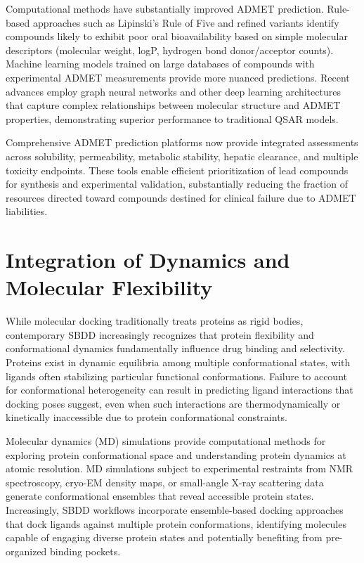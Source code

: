 \documentclass[12pt,a4paper]{article}
\begin{document}
Computational methods have substantially improved ADMET prediction. Rule-based approaches such as Lipinski's Rule of Five and refined variants identify compounds likely to exhibit poor oral bioavailability based on simple molecular descriptors (molecular weight, logP, hydrogen bond donor/acceptor counts). Machine learning models trained on large databases of compounds with experimental ADMET measurements provide more nuanced predictions. Recent advances employ graph neural networks and other deep learning architectures that capture complex relationships between molecular structure and ADMET properties, demonstrating superior performance to traditional QSAR models.

Comprehensive ADMET prediction platforms now provide integrated assessments across solubility, permeability, metabolic stability, hepatic clearance, and multiple toxicity endpoints. These tools enable efficient prioritization of lead compounds for synthesis and experimental validation, substantially reducing the fraction of resources directed toward compounds destined for clinical failure due to ADMET liabilities.

\section*{Integration of Dynamics and Molecular Flexibility}

While molecular docking traditionally treats proteins as rigid bodies, contemporary SBDD increasingly recognizes that protein flexibility and conformational dynamics fundamentally influence drug binding and selectivity. Proteins exist in dynamic equilibria among multiple conformational states, with ligands often stabilizing particular functional conformations. Failure to account for conformational heterogeneity can result in predicting ligand interactions that docking poses suggest, even when such interactions are thermodynamically or kinetically inaccessible due to protein conformational constraints.

Molecular dynamics (MD) simulations provide computational methods for exploring protein conformational space and understanding protein dynamics at atomic resolution. MD simulations subject to experimental restraints from NMR spectroscopy, cryo-EM density maps, or small-angle X-ray scattering data generate conformational ensembles that reveal accessible protein states. Increasingly, SBDD workflows incorporate ensemble-based docking approaches that dock ligands against multiple protein conformations, identifying molecules capable of engaging diverse protein states and potentially benefiting from pre-organized binding pockets.
\end{document}

